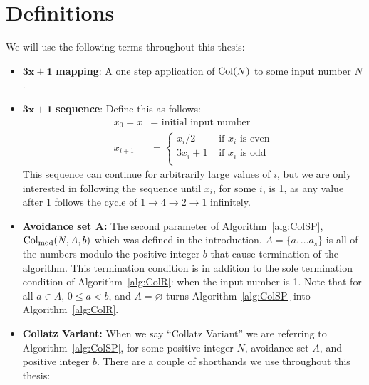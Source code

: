 \chapter{Definitions} \label{sec:defns}
We will use the following terms throughout this thesis:
\begin{itemize}
    \item $\boldsymbol{3x+1}$\textbf{ mapping}: A one step application of $\mathrm{Col}(N)$ to some input number $N$.
    \item $\boldsymbol{3x+1}$\textbf{ sequence}: Define this as follows: 
    \begin{align*}
        x_0 = x &= \text{ initial input number} \\
        x_{i+1} &= \begin{cases} 
        x_{i}/2 &\text{ if $x_i$ is even} \\
        3 x_{i} + 1 &\text{ if $x_i$ is odd} \\
        \end{cases}
    \end{align*}
    This sequence can continue for arbitrarily large values of $i$, but we are only interested in following the sequence until $x_i$, for some $i$, is 1, as any value after 1 follows the cycle of $1 \rightarrow 4 \rightarrow 2 \rightarrow 1$ infinitely.
    \item \textbf{Avoidance set $\boldsymbol A$:} The second parameter of Algorithm~\ref{alg:ColSP}, $\mathrm{Col}_{\text{mod}}(N,A,b)$ which was defined in the introduction. $A = \{a_1 \ldots a_s\}$ is all of the numbers modulo the positive integer $b$ that cause termination of the algorithm. This termination condition is in addition to the sole termination condition of Algorithm~\ref{alg:ColR}: when the input number is 1. Note that for all $a \in A$, $0 \le a < b$, and $A = \varnothing$ turns Algorithm~\ref{alg:ColSP} into Algorithm~\ref{alg:ColR}.
    \item \textbf{Collatz Variant:} When we say ``Collatz Variant'' we are referring to Algorithm~\ref{alg:ColSP}, for some positive integer $N$, avoidance set $A$, and positive integer $b$. There are a couple of shorthands we use throughout this thesis:
      \begin{itemize}

\end{itemize}
\end{itemize}
